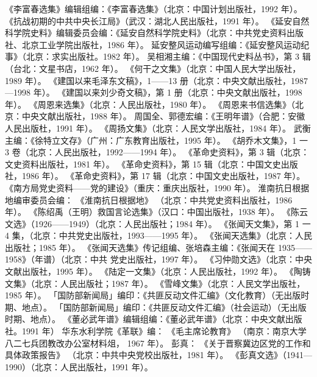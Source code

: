\begin{thebibliography}{999}
\bibitem{} 《李富春选集》编辑组编：《李富春选集》（北京：中国计划出版社，1992 年）。
\bibitem{} 《抗战初期的中共中央长江局》（武汉：湖北人民出版社，1991 年）。
\bibitem{} 《延安自然科学院史料》编辑委员会编：《延安自然科学院史料》（北京：中共党史资料出版
社、北京工业学院出版社，1986 年）。
\bibitem{} 延安整风运动编写组编：《延安整风运动纪事》（北京：求实出版社。1982 年）。
\bibitem{} 吴相湘主编：《中国现代史料丛书》，第 3 辑（台北：文星书店，1962 年）。
\bibitem{} 《何干之文集》（北京：中国人民大学出版社，1989 年）。
\bibitem{} 《建国以来毛泽东文稿》，1——13 册（北京：中央文献出版社，1987—1998 年）。
\bibitem{} 《建国以来刘少奇文稿》，第 1 册（北京：中央文献出版社，1998 年）。
\bibitem{} 《周恩来选集》（北京：人民出版社，1980 年）。
\bibitem{} 《周恩来书信选集》（北京：中央文献出版社，1988 年）。
\bibitem{} 周国全、郭德宏编：《王明年谱》（合肥：安徽人民出版杜，1991 年）。
\bibitem{} 《周扬文集》（北京：人民文学出版社，1984 年）。
\bibitem{} 武衡主编：《徐特立文存》（广州：广东教育出版社，1995 年）。
\bibitem{} 《胡乔木文集》，1 一 3 卷（北京：人民出版社，1992——1994 年）。
\bibitem{} 《革命史资料》，第 3 辑（北京：文史资料出版社，1981 年）。
\bibitem{} 《革命史资料》，第 15 辑（北京：中国文史出版社，1986 年）。
\bibitem{} 《革命史资料》，第 17 辑（北京：中国文史出版社，1987 年）。
\bibitem{} 《南方局党史资料——党的建设》（重庆：重庆出版社，1990 年）。
\bibitem{} 淮南抗日根据地编审委员会编：
《淮南抗日根据地》
（北京：中共党史资料出版社，1986 年）。
\bibitem{} 《陈绍禹（王明）救国言论选集》（汉口：中国出版社，1938 年）。
\bibitem{} 《陈云文选》（1926——1949）（北京：人民出版社；1984 年）。
\bibitem{} 《张闻天文集》，第 1 一 4 集，（北京：中共党史出版社，1993——1995 年）。
\bibitem{} 《张闻天选集》（北京：人民出版社；1985 年）。
\bibitem{} 《张闻天选集》传记组编、张培森主编：《张闻天在 1935——1958》（年谱）（北京：中共
党史出版社，1997 年）。
\bibitem{} 《习仲勋文选》（北京：中央文献出版社，1995 年）。
\bibitem{} 《陆定一文集》（北京：人民出版社，1992 年）。
\bibitem{} 《陶铸文集》（北京：人民出版社；1987 年）。
\bibitem{} 《雪峰文集》（北京：人民文学出版社，1985 年）。
\bibitem{} 「国防部新闻局」编印：《共匪反动文件汇编》（文化教育）（无出版时期、地点）。
\bibitem{} 「国防部新闻局」编印：《共匪反动文件汇编》（社会运动）（无出版时期、地点）。
\bibitem{} 《董必武年谱》编辑组编：《董必武年谱》（北京：中央文献出版社。1991 年）
\bibitem{} 华东水利学院《革联》编：
《毛主席论教育》
（南京：南京大学八二七兵团教改办公室材料俎，
1967 年）。
\bibitem{} 彭真：
《关于晋察冀边区党的工作和具体政策报告》
（北京：中共中央党校出版社，1981 年）。
\bibitem{} 《彭真文选》（1941—1990）（北京：人民出版社，1991 年）。

\end{thebibliography}
